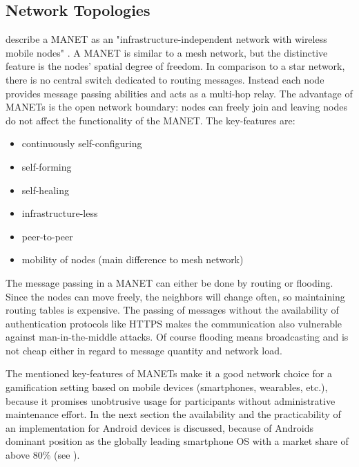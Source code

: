 \subsection{Network Topologies} \label{Network Topologies}

\begingroup 
\sloppy
\textcite{Dorri2015} describe a \gls{MANET} as an "infrastructure-in\-de\-pen\-dent network with wireless mobile nodes" \autocite[p. 15]{Dorri2015}. A \gls{MANET} is similar to a mesh network, but the distinctive feature is the nodes' spatial degree of freedom. In comparison to a star network, there is no central switch dedicated to routing messages. Instead each node provides message passing abilities and acts as a multi-hop relay.
\endgroup
The advantage of \glspl{MANET} is the open network boundary: nodes can freely join and leaving nodes do not affect the functionality of the \gls{MANET}. The key-features are:

\begin{itemize}  
	\item continuously self-configuring
	\item self-forming
	\item self-healing
	\item infrastructure-less
	\item peer-to-peer
	\item  mobility of nodes (main difference to mesh network)
\end{itemize}

The message passing in a \gls{MANET} can either be done by routing or flooding. Since the nodes can move freely, the neighbors will change often, so maintaining routing tables is expensive. The passing of messages without the availability of authentication protocols like \gls{HTTPS} makes the communication also vulnerable against man-in-the-middle attacks. Of course flooding means broadcasting and is not cheap either in regard to message quantity and network load.

The mentioned key-features of \glspl{MANET} make it a good network choice for a gamification setting based on mobile devices (smartphones, wearables, etc.), because it promises unobtrusive usage for participants without administrative maintenance effort. In the next section the availability and the practicability of an implementation for Android devices is discussed, because of Androids dominant position as the globally leading smartphone \gls{OS} with a market share of above 80\% (see \textcite{Online:Gartner2016}). 

